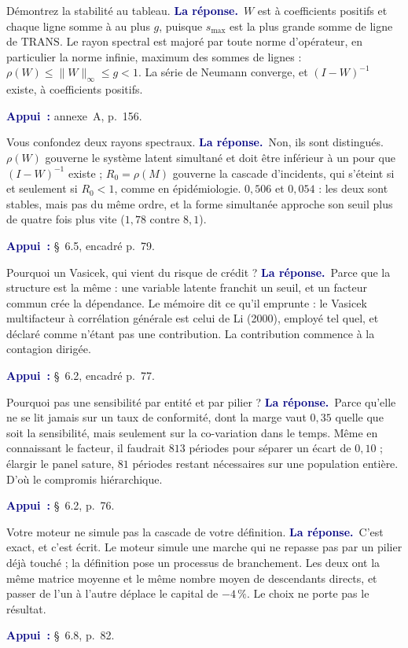\documentclass[11pt,a4paper]{article}
\newcommand{\rep}[1]{\smallskip\noindent\textcolor{navy}{\textbf{La réponse.}}\ #1\par}
\newcommand{\appui}[1]{\smallskip\noindent\small\textcolor{navy}{\textbf{Appui~:}} #1\par\normalsize}
\begin{document}
\begin{question}{\og Démontrez la stabilité au tableau.\fg{}}
\rep{$W$ est à coefficients positifs et chaque ligne somme à au plus $g$, puisque $s_{\max}$ est la
plus grande somme de ligne de $\mathrm{TRANS}$. Le rayon spectral est majoré par toute norme
d'opérateur, en particulier la norme infinie, maximum des sommes de lignes :
$\rho(W)\le\lVert W\rVert_\infty\le g<1$. La série de Neumann converge, et $(I-W)^{-1}$ existe, à
coefficients positifs.}
\appui{annexe~A, p.~156.}
\end{question}

\begin{question}{\og Vous confondez deux rayons spectraux.\fg{}}
\rep{Non, ils sont distingués. $\rho(W)$ gouverne le système latent simultané et doit être
inférieur à un pour que $(I-W)^{-1}$ existe ; $R_0=\rho(M)$ gouverne la cascade d'incidents, qui
s'éteint si et seulement si $R_0<1$, comme en épidémiologie. $0{,}506$ et $0{,}054$ : les deux sont
stables, mais pas du même ordre, et la forme simultanée approche son seuil plus de quatre fois
plus vite ($1{,}78$ contre $8{,}1$).}
\appui{\S~6.5, encadré p.~79.}
\end{question}

\begin{question}{\og Pourquoi un Vasicek, qui vient du risque de crédit ?\fg{}}
\rep{Parce que la structure est la même : une variable latente franchit un seuil, et un facteur
commun crée la dépendance. Le mémoire dit ce qu'il emprunte : le Vasicek multifacteur à
corrélation générale est celui de Li (2000), employé tel quel, et déclaré comme n'étant pas une
contribution. La contribution commence à la contagion dirigée.}
\appui{\S~6.2, encadré p.~77.}
\end{question}

\begin{question}{\og Pourquoi pas une sensibilité par entité et par pilier ?\fg{}}
\rep{Parce qu'elle ne se lit jamais sur un taux de conformité, dont la marge vaut $0{,}35$ quelle
que soit la sensibilité, mais seulement sur la co-variation dans le temps. Même en connaissant le
facteur, il faudrait $813$ périodes pour séparer un écart de $0{,}10$ ; élargir le panel sature,
$81$ périodes restant nécessaires sur une population entière. D'où le compromis hiérarchique.}
\appui{\S~6.2, p.~76.}
\end{question}

\begin{question}{\og Votre moteur ne simule pas la cascade de votre définition.\fg{}}
\rep{C'est exact, et c'est écrit. Le moteur simule une marche qui ne repasse pas par un pilier
déjà touché ; la définition pose un processus de branchement. Les deux ont la même matrice moyenne
et le même nombre moyen de descendants directs, et passer de l'un à l'autre déplace le capital de
$-4\,\%$. Le choix ne porte pas le résultat.}
\appui{\S~6.8, p.~82.}
\end{question}
\end{document}
